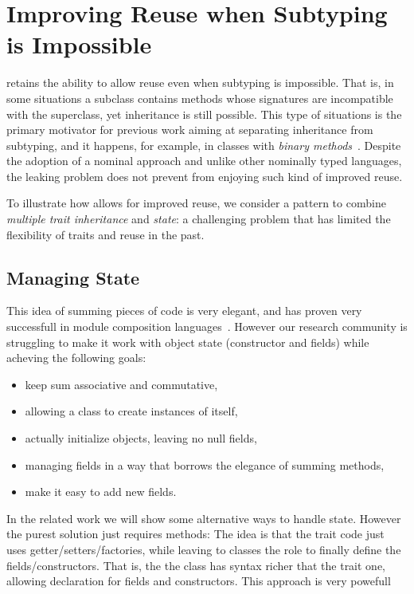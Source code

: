 \section{Improving Reuse when Subtyping is Impossible}

\name retains the ability to allow reuse even when subtyping is
impossible. That is, in some situations a subclass contains methods
whose signatures are incompatible with the superclass, yet inheritance
is still possible. This type of situations is the primary motivator
for previous work aiming at separating inheritance from subtyping, and
it happens, for example, in classes with \emph{binary
  methods}~\cite{}.  Despite the adoption of a nominal approach and
unlike other nominally typed languages, the leaking problem does not
prevent \name from enjoying such kind of improved reuse.

To illustrate how \name allows for improved reuse, we consider a
pattern to combine \emph{multiple trait inheritance} and \emph{state}:
a challenging problem that has limited the flexibility of traits and
reuse in the past.

\subsection{Managing State}

This idea of summing pieces of code is very elegant, and has proven
very successfull in module composition
languages~\cite{ancona2002calculus}. 
However our research community is
struggling to make it work with object state (constructor and fields)
while acheving the following goals:

\begin{itemize}
\item keep sum associative and commutative,
\item allowing a class to create instances of itself,
\item actually initialize objects, leaving no null fields,
\item managing fields in a way that borrows the elegance of summing methods,
\item make it easy to add new fields.
\end{itemize}

In the related work we will show some alternative ways to handle state.
However the purest solution just requires methods:
  The idea is that
  the trait code just uses getter/setters/factories, while leaving
  to classes the role to finally define the fields/constructors.
  That is, the  the class has syntax richer that the trait one,
  allowing declaration for fields and constructors.
  This approach is very powefull~\cite{wang2016classless}
 
